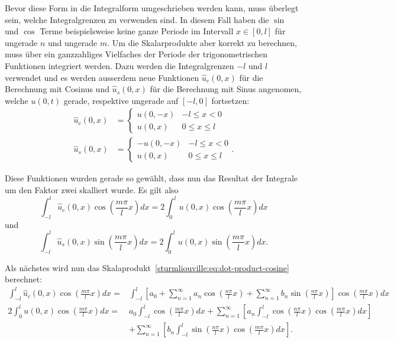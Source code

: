 Bevor diese Form in die Integralform umgeschrieben werden kann, muss überlegt
sein, welche Integralgrenzen zu verwenden sind.
In diesem Fall haben die $\sin$ und $\cos$ Terme beispielsweise keine ganze
Periode im Intervall $x \in [0, l]$ für ungerade $n$ und ungerade $m$.
Um die Skalarprodukte aber korrekt zu berechnen, muss über ein ganzzahliges
Vielfaches der Periode der trigonometrischen Funktionen integriert werden.
Dazu werden die Integralgrenzen $-l$ und $l$ verwendet und es werden ausserdem
neue Funktionen $\hat{u}_c(0, x)$ für die Berechnung mit Cosinus und
$\hat{u}_s(0, x)$ für die Berechnung mit Sinus angenomen, welche $u(0, t)$
gerade, respektive ungerade auf $[-l, 0]$ fortsetzen:
\[
\begin{aligned}
    \hat{u}_c(0, x)
    &=
    \begin{cases}
        u(0, -x) & -l \leq x < 0
        \\
        u(0, x) & 0 \leq x \leq l
    \end{cases}
    \\
    \hat{u}_s(0, x)
    &=
    \begin{cases}
        -u(0, -x) & -l \leq x < 0
        \\
        u(0, x) & 0 \leq x \leq l
    \end{cases}.
\end{aligned}
\]

Diese Funktionen wurden gerade so gewählt, dass nun das Resultat der Integrale
um den Faktor zwei skalliert wurde.
Es gilt also
\[
    \int_{-l}^{l}\hat{u}_c(0, x)\cos\left(\frac{m \pi}{l}x\right)dx
    =
    2\int_{0}^{l}u(0, x)\cos\left(\frac{m \pi}{l}x\right)dx
\]
und
\[
    \int_{-l}^{l}\hat{u}_s(0, x)\sin\left(\frac{m \pi}{l}x\right)dx
    =
    2\int_{0}^{l}u(0, x)\sin\left(\frac{m \pi}{l}x\right)dx.
\]

Als nächstes wird nun das
Skalaprodukt~\eqref{sturmliouville:eq:dot-product-cosine} berechnet:
\[
\begin{aligned}
    \int_{-l}^{l}\hat{u}_c(0, x)\cos\left(\frac{m \pi}{l}x\right)dx
    =&
    \int_{-l}^{l} \left[a_0
    +
    \sum_{n = 1}^{\infty} a_n\cos\left(\frac{n\pi}{l}x\right)
    +
    \sum_{n = 1}^{\infty} b_n\sin\left(\frac{n\pi}{l}x\right)\right]
    \cos\left(\frac{m \pi}{l}x\right) dx
    \\
    2\int_{0}^{l}u(0, x)\cos\left(\frac{m \pi}{l}x\right)dx
    =&
    a_0 \int_{-l}^{l}\cos\left(\frac{m \pi}{l}x\right) dx
    +
    \sum_{n = 1}^{\infty}\left[a_n\int_{-l}^{l}\cos\left(\frac{n\pi}{l}x\right)
        \cos\left(\frac{m \pi}{l}x\right)dx\right]
    \\
    &+
    \sum_{n = 1}^{\infty}\left[b_n\int_{-l}^{l}\sin\left(\frac{n\pi}{l}x\right)
        \cos\left(\frac{m \pi}{l}x\right)dx\right].
\end{aligned}
\]

